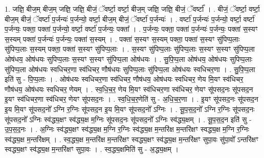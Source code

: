 \documentclass[17pt]{extarticle}
\begin{document}
1. जज्ञि॒ बीज॒म् बीज॒म् जज्ञि॒ जज्ञि॒ बीजं॒ ॅवर्ष्टा॒ वर्ष्टा॒ बीज॒म् जज्ञि॒ जज्ञि॒ बीजं॒ ॅवर्ष्टा᳚ । . बीजं॒ ॅवर्ष्टा॒ वर्ष्टा॒ बीज॒म् बीजं॒ ॅवर्ष्टा॑ प॒र्जन्यः॑ प॒र्जन्यो॒ वर्ष्टा॒ बीज॒म् बीजं॒ ॅवर्ष्टा॑ प॒र्जन्यः॑ । . वर्ष्टा॑ प॒र्जन्यः॑ प॒र्जन्यो॒ वर्ष्टा॒ वर्ष्टा॑ प॒र्जन्यः॒ पक्ता॒ पक्ता॑ प॒र्जन्यो॒ वर्ष्टा॒ वर्ष्टा॑ प॒र्जन्यः॒ पक्ता᳚ । . प॒र्जन्यः॒ पक्ता॒ पक्ता॑ प॒र्जन्यः॑ प॒र्जन्यः॒ पक्ता॑ स॒स्यꣳ स॒स्यम् पक्ता॑ प॒र्जन्यः॑ प॒र्जन्यः॒ पक्ता॑ स॒स्यम् । . पक्ता॑ स॒स्यꣳ स॒स्यम् पक्ता॒ पक्ता॑ स॒स्यꣳ सु॑पिप्प॒लाः सु॑पिप्प॒लाः स॒स्यम् पक्ता॒ पक्ता॑ स॒स्यꣳ सु॑पिप्प॒लाः । . स॒स्यꣳ सु॑पिप्प॒लाः सु॑पिप्प॒लाः स॒स्यꣳ स॒स्यꣳ सु॑पिप्प॒ला ओष॑धय॒ ओष॑धयः सुपिप्प॒लाः स॒स्यꣳ स॒स्यꣳ सु॑पिप्प॒ला ओष॑धयः । . सु॒पि॒प्प॒ला ओष॑धय॒ ओष॑धयः सुपिप्प॒लाः सु॑पिप्प॒ला ओष॑धयः स्वधिचर॒णा स्व॑धिचर॒ णौष॑धयः सुपिप्प॒लाः सु॑पिप्प॒ला ओष॑धयः स्वधिचर॒णा । . सु॒पि॒प्प॒ला इति॑ सु - पि॒प्प॒लाः । . ओष॑धयः स्वधिचर॒णा स्व॑धिचर॒ णौष॑धय॒ ओष॑धयः स्वधिचर॒ णेय मि॒यꣳ स्व॑धिचर॒
णौष॑धय॒ ओष॑धयः स्वधिचर॒ णेयम् । . स्व॒धि॒च॒र॒ णेय मि॒यꣳ स्व॑धिचर॒णा स्व॑धिचर॒ णेयꣳ सू॑पसद॒नः सू॑पसद॒न इ॒यꣳ स्व॑धिचर॒णा स्व॑धिचर॒ णेयꣳ सू॑पसद॒नः । . स्व॒धि॒च॒र॒णेति॑ सु - अ॒धि॒च॒र॒णा । . इ॒यꣳ सू॑पसद॒नः सू॑पसद॒न इ॒य मि॒यꣳ सू॑पसद॒नो᳚ ऽग्नि र॒ग्निः सू॑पसद॒न इ॒य मि॒यꣳ सू॑पसद॒नो᳚ ऽग्निः । . सू॒प॒स॒द॒नो᳚ ऽग्नि र॒ग्निः सू॑पसद॒नः सू॑पसद॒नो᳚ ऽग्निः स्व॑द्ध्य॒क्षꣳ स्व॑द्ध्य॒क्ष म॒ग्निः सू॑पसद॒नः सू॑पसद॒नो᳚ ऽग्निः स्व॑द्ध्य॒क्षम् । . सू॒प॒स॒द॒न इति॑ सु - उ॒प॒स॒द॒नः । . अ॒ग्निः स्व॑द्ध्य॒क्षꣳ स्व॑द्ध्य॒क्ष म॒ग्नि र॒ग्निः स्व॑द्ध्य॒क्ष म॒न्तरि॑क्ष म॒न्तरि॑क्षꣳ स्वद्ध्य॒क्ष म॒ग्नि र॒ग्निः स्व॑द्ध्य॒क्ष म॒न्तरि॑क्षम् । . स्व॒द्ध्य॒क्ष म॒न्तरि॑क्ष म॒न्तरि॑क्षꣳ स्वद्ध्य॒क्षꣳ स्व॑द्ध्य॒क्ष म॒न्तरि॑क्षꣳ सुपा॒वः सु॑पा॒वो᳚ ऽन्तरि॑क्षꣳ स्वद्ध्य॒क्षꣳ स्व॑द्ध्य॒क्ष म॒न्तरि॑क्षꣳ सुपा॒वः । . स्व॒द्ध्य॒क्षमिति॑ सु - अ॒द्ध्य॒क्षम् । \newline
\end{document}

